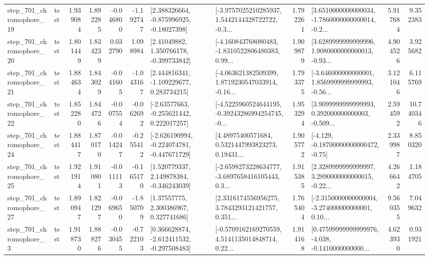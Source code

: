 \begin{tabular}{llrrrrllrlrr}
  step\_701\_chromophore\_19 &      test &      1.939084 &    1.892285 &     -0.046800 & -1.192747 &    [2.388326664, -0.875996925, -0.18027398] &  [-3.9757025210285937, 1.5442144328722722, -0.3... &       1.792261 &  [3.6510000000000034, -1.7860000000000014, -0.2... &            5.917684 &          9.352383 \\
  step\_701\_chromophore\_20 &      test &      1.801449 &    1.834239 &      0.032790 &  1.098984 &     [2.41049882, 1.350766178, -0.399733842] &  [-4.160843768080483, -1.8310522806480383, 0.99... &       1.909879 &  [3.6289999999999996, 1.9080000000000013, -0.93... &            4.904526 &          3.925682 \\
  step\_701\_chromophore\_21 &      test &      1.884634 &    1.843029 &     -0.041605 & -1.043167 &    [2.444816341, -1.109229677, 0.283734215] &  [-4.063621382509399, 1.8719230547033914, -0.16... &       1.793375 &  [-3.646000000000001, 1.8569999999999993, -0.56... &            3.121046 &          6.115769 \\
  step\_701\_chromophore\_22 &      test &      1.852280 &    1.844726 &     -0.007554 & -0.062692 &    [-2.63577663, -0.255621442, 0.222017257] &  [-4.5225960524644195, -0.39243286994254745, -0... &       1.953294 &  [3.9099999999999993, 0.392000000000003, -0.509... &            2.594592 &         10.740346 \\
  step\_701\_chromophore\_24 &      test &      1.884417 &    1.870170 &     -0.014247 & -0.255412 &  [-2.626190994, -0.224074781, -0.447671729] &  [4.48975400571684, 0.5321447993823273, 0.19431... &       1.905772 &              [-4.129, -0.18700000000000472, -0.75] &            2.339987 &          8.850320 \\
  step\_701\_chromophore\_25 &      test &      1.921914 &    1.910801 &     -0.011113 & -0.165170 &    [1.520779337, 2.149878384, -0.346243039] &  [-2.6598273228634777, -3.6897658416105443, 0.3... &       1.915385 &  [2.3289999999999997, 3.2890000000000015, -0.22... &            4.266642 &          1.184705 \\
  step\_701\_chromophore\_27 &      test &      1.890947 &    1.821297 &     -0.069650 & -1.850709 &      [1.37557775, 2.300386967, 0.327741686] &  [2.3316174556956275, 3.7843293121421757, 0.351... &       1.765404 &  [-2.3150000000000004, -3.274000000000001, 0.10... &            9.560355 &          7.049632 \\
   step\_701\_chromophore\_3 &      test &      1.918730 &    1.888276 &     -0.030455 & -0.722103 &   [0.366628874, -2.612411532, -0.297508483] &  [-0.5709162169270559, 4.5141135014848714, 0.22... &       1.914168 &  [0.47599999999999976, -4.038, -0.1410000000000... &            4.623930 &          0.931921 \\

\end{tabular}
